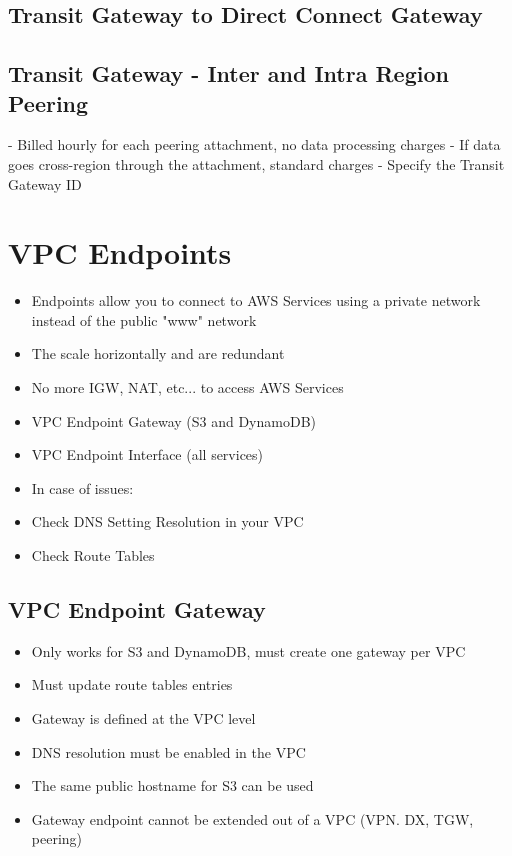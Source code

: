 \subsection{Transit Gateway to Direct Connect Gateway}

\subsection{Transit Gateway - Inter and Intra Region Peering}
- Billed hourly for each peering attachment, no data processing charges
- If data goes cross-region through the attachment, standard charges
- Specify the Transit Gateway ID


\section{VPC Endpoints}
\begin{itemize}
    \item Endpoints allow you to connect to AWS Services using a private network instead of the public "www" network
    \item The scale horizontally and are redundant
    \item No more IGW, NAT, etc... to access AWS Services
    \item VPC Endpoint Gateway (S3 and DynamoDB)
    \item VPC Endpoint Interface (all services)
    \item In case of issues:
    \item Check DNS Setting Resolution in your VPC
    \item Check Route Tables
\end{itemize}

\subsection{VPC Endpoint Gateway}
\begin{itemize}
    \item Only works for S3 and DynamoDB, must create one gateway per VPC
    \item Must update route tables entries
    \item Gateway is defined at the VPC level
    \item DNS resolution must be enabled in the VPC
    \item The same public hostname for S3 can be used
    \item Gateway endpoint cannot be extended out of a VPC (VPN. DX, TGW, peering)
\end{itemize}


